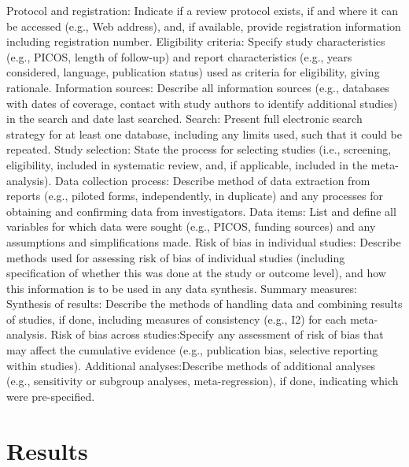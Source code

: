 \documentclass{article}\usepackage[]{graphicx}\usepackage[]{color}
\begin{document}
              Protocol and registration: Indicate if a review protocol exists, if and where it can be accessed (e.g., Web address), and, if available, provide registration information including registration number.
              Eligibility criteria: Specify study characteristics (e.g., PICOS, length of follow-up) and report characteristics (e.g., years considered, language, publication status) used as criteria for eligibility, giving rationale.
              Information sources: Describe all information sources (e.g., databases with dates of coverage, contact with study authors to identify additional studies) in the search and date last searched.
              Search: Present full electronic search strategy for at least one database, including any limits used, such that it could be repeated.
              Study selection: State the process for selecting studies (i.e., screening, eligibility, included in systematic review, and, if applicable, included in the meta-analysis).
              Data collection process: Describe method of data extraction from reports (e.g., piloted forms, independently, in duplicate) and any processes for obtaining and confirming data from investigators.
              Data items: List and define all variables for which data were sought (e.g., PICOS, funding sources) and any assumptions and simplifications made.
              Risk of bias in individual studies: Describe methods used for assessing risk of bias of individual studies (including specification of whether this was done at the study or outcome level), and how this information is to be used in any data synthesis.
              Summary measures:
              Synthesis of results: Describe the methods of handling data and combining results of studies, if done, including measures of consistency (e.g., I2) for each meta-analysis.
              Risk of bias across studies:Specify any assessment of risk of bias that may affect the cumulative evidence (e.g., publication bias, selective reporting within studies).
              Additional analyses:Describe methods of additional analyses (e.g., sensitivity or subgroup analyses, meta-regression), if done, indicating which were pre-specified.
              

\section{Results}
\end{document}
